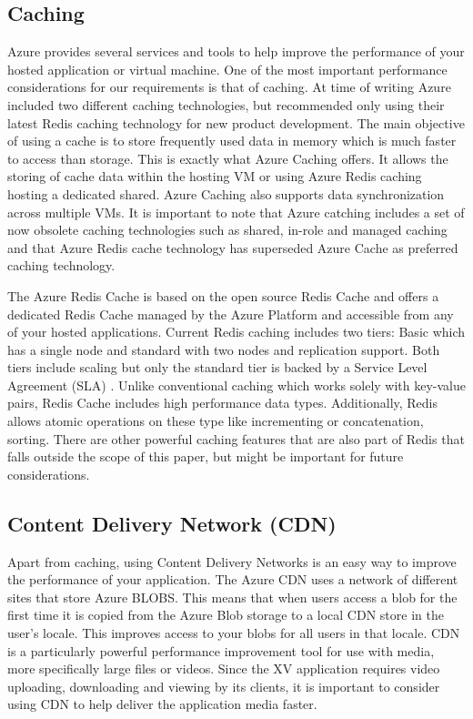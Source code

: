 \subsection{Caching}

Azure provides several services and tools to help improve the performance of your hosted application or virtual machine. One of the most important performance considerations for our requirements is that of caching. At time of writing Azure included two different caching technologies, but recommended only using their latest Redis caching technology for new product development. The main objective of using a cache is to store frequently used data in memory which is much faster to access than storage. This is exactly what Azure Caching offers. It allows the storing of cache data within the hosting VM or using Azure Redis caching hosting a dedicated shared. Azure Caching also supports data synchronization across multiple VMs. It is important to note that Azure catching includes a set of now obsolete caching technologies such as shared, in-role and managed caching \cite{Microsoft_Corporation_undated-ej} and that Azure Redis cache  technology has superseded Azure Cache as preferred caching technology.

The Azure Redis Cache is based on the open source Redis Cache and offers a dedicated Redis Cache managed by the Azure Platform and accessible from any of your hosted applications. Current Redis caching includes two tiers: Basic which has a single node and standard with two nodes and replication support. Both tiers include scaling but only the standard tier is backed by a Service Level Agreement (SLA) \cite{Azure_Redis}. Unlike conventional caching which works solely with key-value pairs, Redis Cache includes high performance data types. Additionally, Redis allows atomic operations on these type like incrementing or concatenation, sorting. There are other powerful caching features that are also part of Redis that falls outside the scope of this paper, but might be important for future considerations.

\subsection{Content Delivery Network (CDN)}

Apart from caching, using Content Delivery Networks is an easy way to improve the performance of your application. The Azure CDN uses a network of different sites that store Azure BLOBS. This means that when users access a blob for the first time it is copied from the Azure Blob storage to a local CDN store in the user's locale. This improves access to your blobs for all users in that locale. CDN is a particularly powerful performance improvement tool for use with media, more specifically large files or videos. Since the XV application requires video uploading, downloading and viewing by its clients, it is important to consider using CDN to help deliver the application media faster.

